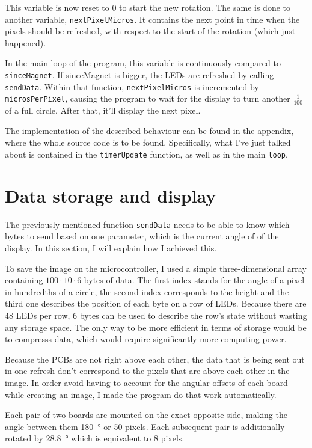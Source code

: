 \documentclass[a4paper, 11pt, titlepage]{report}
\begin{document}
This variable is now reset to 0 to start the new rotation. The same is done to another
variable, \texttt{nextPixelMicros}. It contains the next point in time when the pixels
should be refreshed, with respect to the start of the rotation (which just happened).

In the main loop of the program, this variable is continuously compared to \texttt{sinceMagnet}. If
sinceMagnet is bigger, the LEDs are refreshed by calling \texttt{sendData}. Within that function,
\texttt{nextPixelMicros} is incremented by \texttt{microsPerPixel}, causing the program to wait for
the display to turn another $\frac{1}{100}$ of a full circle. After that, it'll display the next
pixel.

The implementation of the described behaviour can be found in the appendix, where the whole source
code is to be found. Specifically, what I've just talked about is contained in the
\texttt{timerUpdate} function, as well as in the main \texttt{loop}.


\section{Data storage and display}

The previously mentioned function \texttt{sendData} needs to be able to know which bytes to send
based on one parameter, which is the current angle of of the display. In this section, I will
explain how I achieved this.

To save the image on the microcontroller, I used a simple three-dimensional array containing $100
\cdot 10 \cdot 6$ bytes of data. The first index stands for the angle of a pixel in hundredths of
a circle, the second index corresponds to the height and the third one describes the position of
each byte on a row of LEDs. Because there are 48 LEDs per row, 6 bytes can be used to describe the
row's state without wasting any storage space. The only way to be more efficient in terms of
storage would be to compresss data, which would require significantly more computing power.

Because the PCBs are not right above each other, the data that is being sent out in one refresh
don't correspond to the pixels that are above each other in the image. In order avoid having to
account for the angular offsets of each board while creating an image, I made the program do that
work automatically.

Each pair of two boards are mounted on the exact opposite side, making the angle between them
\SI{180}{\degree} or 50 pixels. Each subsequent pair is additionally rotated by \SI{28.8}{\degree}
which is equivalent to 8 pixels.
\end{document}
